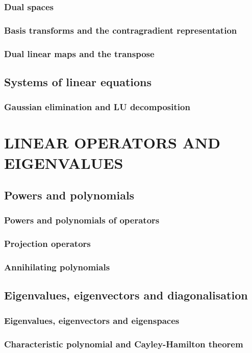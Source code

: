 \documentclass[a4paper,twoside]{article}
\theoremstyle{definition}
\theoremstyle{plain}
\begin{document}
\subsubsection{Dual spaces}
\subsubsection{Basis transforms and the contragradient representation}
\subsubsection{Dual linear maps and the transpose}
\subsection{Systems of linear equations}
\subsubsection{Gaussian elimination and LU decomposition}

\section{LINEAR OPERATORS AND EIGENVALUES}
\subsection{Powers and polynomials}
\subsubsection{Powers and polynomials of operators}
\subsubsection{Projection operators}
\subsubsection{Annihilating polynomials}
\subsection{Eigenvalues, eigenvectors and diagonalisation}
\subsubsection{Eigenvalues, eigenvectors and eigenspaces}
\subsubsection{Characteristic polynomial and Cayley-Hamilton theorem}
\end{document}
